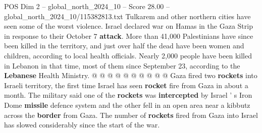 \begin{textsample}{POS Dim 2 – global\_north\_2024\_10 – Score 28.00 – global\_north\_2024\_10/115382813.txt}
Tulkarem and other northern cities have seen some of the worst violence.
Israel declared war on Hamas in the Gaza Strip in response to their October 7 \textbf{attack}.
More than 41,000 Palestinians have since been killed in the territory, and just over half the dead have been women and children, according to local health officials.
Nearly 2,000 people have been killed in Lebanon in that time, most of them since September 23, according to the \textbf{Lebanese} Health Ministry. @ @ @ @ @ @ @ @ @ @ Gaza fired two \textbf{rockets} into Israeli territory, the first time Israel has seen \textbf{rocket} fire from Gaza in about a month.
The military said one of the \textbf{rockets} was \textbf{intercepted} by Israel ' s Iron Dome \textbf{missile} defence system and the other fell in an open area near a kibbutz across the \textbf{border} from Gaza.
The number of \textbf{rockets} fired from Gaza into Israel has slowed considerably since the start of the war.

\end{textsample}
